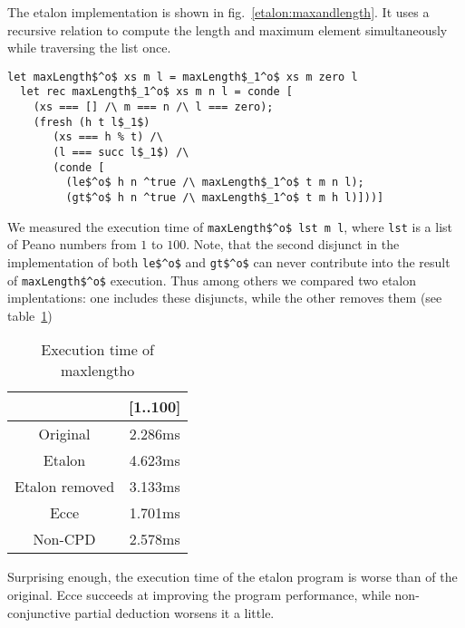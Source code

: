 The etalon implementation is shown in fig.~\ref{etalon:maxandlength}.
It uses a recursive relation to compute the length and maximum element simultaneously while traversing the list once.

\begin{figure*}[!h]
  \centering
  \begin{minipage}{0.8\textwidth}
\begin{lstlisting}[label={etalon:maxandlength}, caption={Etalon implementation of maxlengtho}, captionpos=b, frame=tb]
  let maxLength$^o$ xs m l = maxLength$_1^o$ xs m zero l
  let rec maxLength$_1^o$ xs m n l = conde [
    (xs === [] /\ m === n /\ l === zero);
    (fresh (h t l$_1$)
       (xs === h % t) /\
       (l === succ l$_1$) /\
       (conde [
         (le$^o$ h n ^true /\ maxLength$_1^o$ t m n l);
         (gt$^o$ h n ^true /\ maxLength$_1^o$ t m h l)]))]
  \end{lstlisting}
\end{minipage}
\end{figure*}

We measured the execution time of \lstinline{maxLength$^o$ lst m l}, where \lstinline{lst} is a list of Peano numbers from $1$ to $100$.
Note, that the second disjunct in the implementation of both \lstinline{le$^o$} and \lstinline{gt$^o$} can never contribute into the result of \lstinline{maxLength$^o$} execution.
Thus among others we compared two etalon implentations: one includes these disjuncts, while the other removes them (see table~\ref{tbl:maxlen})


\begin{table}
  \centering
  \begin{tabular}{c||c}
                   & [1..100] \\ \hline\hline
  Original         & 2.286ms  \\ \hline
  Etalon           & 4.623ms  \\ \hline
  Etalon removed   & 3.133ms  \\ \hline
  Ecce             & 1.701ms  \\ \hline
  Non-CPD          & 2.578ms
  \end{tabular}

  \caption{Execution time of maxlengtho}
  \label{tbl:maxlen}
\end{table}

Surprising enough, the execution time of the etalon program is worse than of the original.
Ecce succeeds at improving the program performance, while non-conjunctive partial deduction worsens it a little.
\todo{why}

